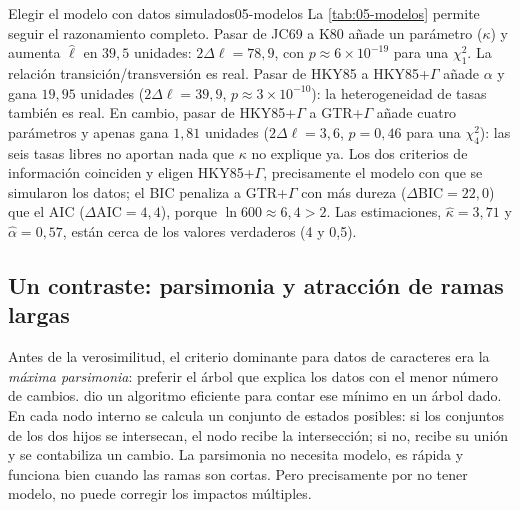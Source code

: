 \begin{table}[t]
\centering
\caption[Selección de modelos sobre datos simulados]{Selección de modelos para un alineamiento de $N=600$ sitios simulado bajo HKY85+$\Gamma$ ($\kappa=4$, $\alpha=0{,}5$) en el árbol de la \cref{fig:05-bootstrap}. Todos los modelos se ajustaron sobre la misma topología (la de NJ); $k$ incluye las 9 ramas. $\Delta$ es la diferencia con el mejor valor de cada criterio. Calculado con el motor de verosimilitud de .}
\label{tab:05-modelos}
\small

\end{table}

\begin{ejemplo}{Elegir el modelo con datos simulados}{05-modelos}
La \cref{tab:05-modelos} permite seguir el razonamiento completo. Pasar de JC69 a K80 añade un parámetro ($\kappa$) y aumenta $\hat\ell$ en $39{,}5$ unidades: $2\Delta\ell=78{,}9$, con $p\approx6\times10^{-19}$ para una $\chi^2_1$. La relación transición/transversión es real. Pasar de HKY85 a HKY85+$\Gamma$ añade $\alpha$ y gana $19{,}95$ unidades ($2\Delta\ell=39{,}9$, $p\approx3\times10^{-10}$): la heterogeneidad de tasas también es real. En cambio, pasar de HKY85+$\Gamma$ a GTR+$\Gamma$ añade cuatro parámetros y apenas gana $1{,}81$ unidades ($2\Delta\ell=3{,}6$, $p=0{,}46$ para una $\chi^2_4$): las seis tasas libres no aportan nada que $\kappa$ no explique ya. Los dos criterios de información coinciden y eligen HKY85+$\Gamma$, precisamente el modelo con que se simularon los datos; el BIC penaliza a GTR+$\Gamma$ con más dureza ($\Delta\mathrm{BIC}=22{,}0$) que el AIC ($\Delta\mathrm{AIC}=4{,}4$), porque $\ln 600\approx 6{,}4>2$. Las estimaciones, $\hat\kappa=3{,}71$ y $\hat\alpha=0{,}57$, están cerca de los valores verdaderos (4 y 0,5).
\end{ejemplo}

\subsection{Un contraste: parsimonia y atracción de ramas largas}

Antes de la verosimilitud, el criterio dominante para datos de caracteres era la \emph{máxima parsimonia}: preferir el árbol que explica los datos con el menor número de cambios. \textcite{c05-fitch1971} dio un algoritmo eficiente para contar ese mínimo en un árbol dado. En cada nodo interno se calcula un conjunto de estados posibles: si los conjuntos de los dos hijos se intersecan, el nodo recibe la intersección; si no, recibe su unión y se contabiliza un cambio. La parsimonia no necesita modelo, es rápida y funciona bien cuando las ramas son cortas. Pero precisamente por no tener modelo, no puede corregir los impactos múltiples.

